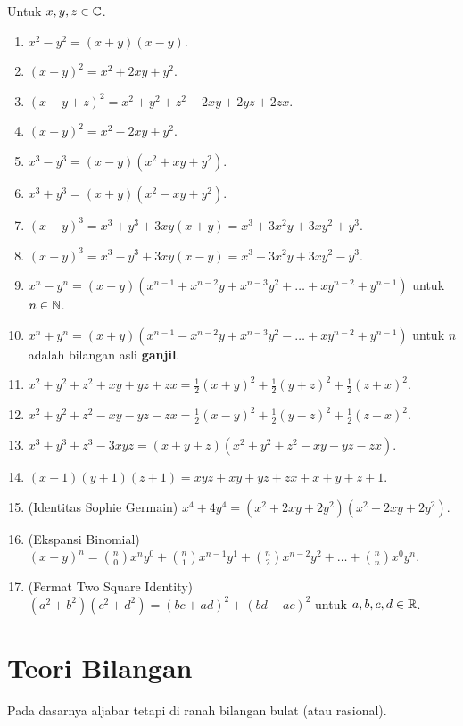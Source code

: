 	Untuk $x,y,z \in \mathbb C$.
	\begin{enumerate}
	    \item $x^2-y^2 = (x+y)(x-y)$.
	    \item $(x+y)^2 = x^2+2xy+y^2$.
	    \item $(x+y+z)^2 = x^2+y^2+z^2+2xy+2yz+2zx$.
	    \item $(x-y)^2 = x^2-2xy+y^2$.
	    \item $x^3-y^3 = (x-y)(x^2+xy+y^2)$.
	    \item $x^3+y^3 = (x+y)(x^2-xy+y^2)$.
	    \item $(x+y)^3 = x^3+y^3+3xy(x+y) = x^3+3x^2y+3xy^2+y^3$. 
	    \item $(x-y)^3 = x^3-y^3+3xy(x-y) = x^3-3x^2y+3xy^2-y^3$. 
	    \item $x^n-y^n = (x-y)(x^{n-1}+x^{n-2}y+x^{n-3}y^2+\dots+xy^{n-2}+y^{n-1})$ untuk $n \in \mathbb N$.
	    \item $x^n+y^n = (x+y)(x^{n-1}-x^{n-2}y+x^{n-3}y^2-\dots+xy^{n-2}+y^{n-1})$ untuk $n$ adalah bilangan asli \textbf{ganjil}.
	    \item $x^2+y^2+z^2+xy+yz+zx = \frac12(x+y)^2+\frac12(y+z)^2+\frac12(z+x)^2$.
	    \item $x^2+y^2+z^2-xy-yz-zx = \frac12(x-y)^2+\frac12(y-z)^2+\frac12(z-x)^2$.
	    \item $x^3+y^3+z^3-3xyz = (x+y+z)(x^2+y^2+z^2-xy-yz-zx)$.
	    \item $(x+1)(y+1)(z+1)=xyz+xy+yz+zx+x+y+z+1$.
	    \item (Identitas Sophie Germain) $x^4+4y^4=(x^2+2xy+2y^2)(x^2-2xy+2y^2)$.
	    \item (Ekspansi Binomial) $(x+y)^n = {n \choose 0}x^ny^0 + {n \choose 1}x^{n-1}y^1+{n \choose 2}x^{n-2}y^2 + \dots + {n \choose n}x^0y^n$.
	    \item (Fermat Two Square Identity) $(a^2+b^2)(c^2+d^2)=(bc+ad)^2+(bd-ac)^2$ untuk $a,b,c,d \in \mathbb R$.
	\end{enumerate}
	
	\section{Teori Bilangan}
	Pada dasarnya aljabar tetapi di ranah bilangan bulat (atau rasional).
